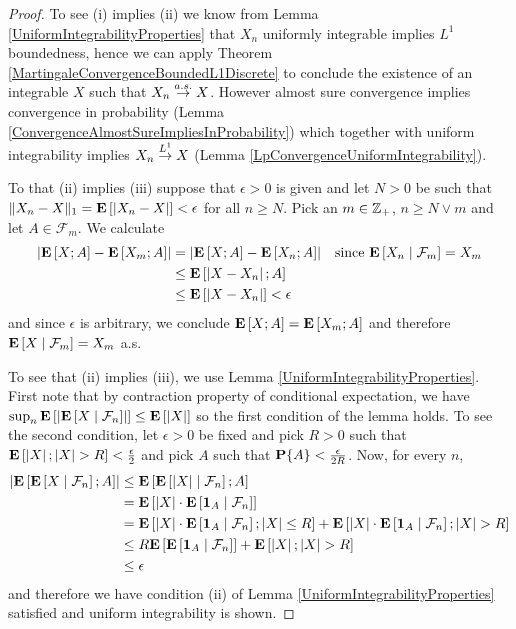\begin{proof}
To see (i) implies (ii) we know from Lemma
\ref{UniformIntegrabilityProperties} that $X_n$ uniformly integrable
implies $L^1$ boundedness, hence we can apply Theorem
\ref{MartingaleConvergenceBoundedL1Discrete}
to conclude the existence of an integrable $X$ such that $X_n \toas
X$.  However almost sure convergence implies convergence in
probability (Lemma \ref{ConvergenceAlmostSureImpliesInProbability})
which together with uniform integrability implies $X_n \tolp{1} X$
(Lemma \ref{LpConvergenceUniformIntegrability}).

To that (ii) implies (iii) suppose that $\epsilon > 0$ is given and
let $N>0$ be such that $\norm{X_n - X}_1 = \expectation{\abs{X_n - X}}
< \epsilon$ for 
all $n \geq N$.  Pick an $m \in \integers_+$, $n \geq N \vee m$ and let $A \in
\mathcal{F}_m$.  We calculate
\begin{align*}
\abs{\expectation{X ; A} - \expectation{X_m ; A} } &=
\abs{\expectation{X ; A} - \expectation{X_n ; A} } & & \text{since
  $\cexpectationlong{\mathcal{F}_m}{X_n} = X_m$}\\
&\leq \expectation{ \abs{X - X_n} ; A} \\
&\leq \expectation{ \abs{X -   X_n}} < \epsilon
\end{align*}
and since $\epsilon$ is arbitrary, we conclude $\expectation{X ; A} =
\expectation{X_m ; A}$ and therefore
$\cexpectationlong{\mathcal{F}_m}{X} = X_m$ a.s.

To see that (ii) implies (iii), we use Lemma
\ref{UniformIntegrabilityProperties}.  First note that by contraction
property of conditional expectation, we have $\sup_n
\expectation{\abs{\cexpectationlong{\mathcal{F}_n}{X}}} \leq
\expectation{\abs{X}}$ so the first condition of the lemma holds.  To
see the second condition, let $\epsilon > 0$ be fixed and pick $R > 0$
such that $\expectation{\abs{X} ; \abs{X} > R} < \frac{\epsilon}{2}$
and pick $A$
such that $\probability{A} < \frac{\epsilon}{2R}$.  Now, for every $n$,
\begin{align*}
\abs{\expectation{\cexpectationlong{\mathcal{F}_n}{X} ; A}} &\leq
\expectation{\cexpectationlong{\mathcal{F}_n}{\abs{X}} ; A} \\
&=\expectation{\abs{X} \cdot \cexpectationlong{\mathcal{F}_n}{
    \characteristic{A}}} \\
&=\expectation{\abs{X} \cdot \cexpectationlong{\mathcal{F}_n}{
    \characteristic{A}} ; \abs{X} \leq R} + 
\expectation{\abs{X} \cdot \cexpectationlong{\mathcal{F}_n}{
    \characteristic{A}} ; \abs{X} > R} \\
&\leq R \expectation{\cexpectationlong{\mathcal{F}_n}{ \characteristic{A}}} + 
\expectation{\abs{X} ; \abs{X} > R} \\
&\leq \epsilon
\end{align*}
and therefore we have condition (ii) of Lemma
\ref{UniformIntegrabilityProperties} satisfied and uniform
integrability is shown.
\end{proof}

